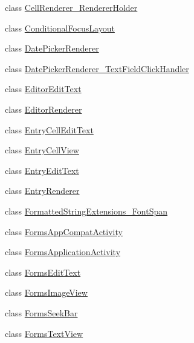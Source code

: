 \begin{CompactItemize}
\item 
class \hyperlink{classmd5b60ffeb829f638581ab2bb9b1a7f4f3f_1_1_cell_renderer___renderer_holder}{CellRenderer\_\-RendererHolder}
\item 
class \hyperlink{classmd5b60ffeb829f638581ab2bb9b1a7f4f3f_1_1_conditional_focus_layout}{ConditionalFocusLayout}
\item 
class \hyperlink{classmd5b60ffeb829f638581ab2bb9b1a7f4f3f_1_1_date_picker_renderer}{DatePickerRenderer}
\item 
class \hyperlink{classmd5b60ffeb829f638581ab2bb9b1a7f4f3f_1_1_date_picker_renderer___text_field_click_handler}{DatePickerRenderer\_\-TextFieldClickHandler}
\item 
class \hyperlink{classmd5b60ffeb829f638581ab2bb9b1a7f4f3f_1_1_editor_edit_text}{EditorEditText}
\item 
class \hyperlink{classmd5b60ffeb829f638581ab2bb9b1a7f4f3f_1_1_editor_renderer}{EditorRenderer}
\item 
class \hyperlink{classmd5b60ffeb829f638581ab2bb9b1a7f4f3f_1_1_entry_cell_edit_text}{EntryCellEditText}
\item 
class \hyperlink{classmd5b60ffeb829f638581ab2bb9b1a7f4f3f_1_1_entry_cell_view}{EntryCellView}
\item 
class \hyperlink{classmd5b60ffeb829f638581ab2bb9b1a7f4f3f_1_1_entry_edit_text}{EntryEditText}
\item 
class \hyperlink{classmd5b60ffeb829f638581ab2bb9b1a7f4f3f_1_1_entry_renderer}{EntryRenderer}
\item 
class \hyperlink{classmd5b60ffeb829f638581ab2bb9b1a7f4f3f_1_1_formatted_string_extensions___font_span}{FormattedStringExtensions\_\-FontSpan}
\item 
class \hyperlink{classmd5b60ffeb829f638581ab2bb9b1a7f4f3f_1_1_forms_app_compat_activity}{FormsAppCompatActivity}
\item 
class \hyperlink{classmd5b60ffeb829f638581ab2bb9b1a7f4f3f_1_1_forms_application_activity}{FormsApplicationActivity}
\item 
class \hyperlink{classmd5b60ffeb829f638581ab2bb9b1a7f4f3f_1_1_forms_edit_text}{FormsEditText}
\item 
class \hyperlink{classmd5b60ffeb829f638581ab2bb9b1a7f4f3f_1_1_forms_image_view}{FormsImageView}
\item 
class \hyperlink{classmd5b60ffeb829f638581ab2bb9b1a7f4f3f_1_1_forms_seek_bar}{FormsSeekBar}
\item 
class \hyperlink{classmd5b60ffeb829f638581ab2bb9b1a7f4f3f_1_1_forms_text_view}{FormsTextView}

\end{CompactItemize}
